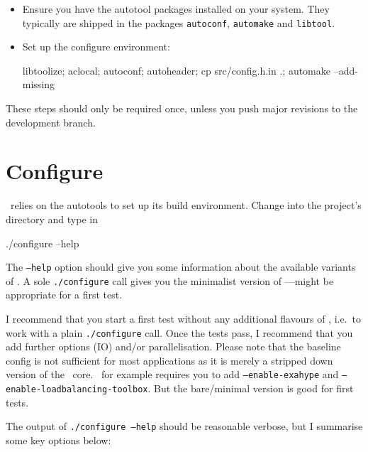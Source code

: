 \begin{itemize}
  \item Ensure you have the autotool packages installed on your system. They
  typically are shipped in the packages \texttt{autoconf}, \texttt{automake} and
  \texttt{libtool}.
  \item Set up the configure environment: 
 \begin{code}
 libtoolize; aclocal; autoconf; autoheader; 
 cp src/config.h.in .; 
 automake --add-missing
 \end{code}
\end{itemize}


\noindent
These steps should only be required once, unless you push major revisions to the
development branch.


\section{Configure}
\label{section:installation:configure}


\Peano\  relies on the autotools to set up its build environment.
Change into the project's directory and type in 
\begin{code}
./configure --help
\end{code}


\noindent
The \texttt{--help} option should give you some information about the available
variants of \Peano.
A sole \texttt{./configure} call gives you the minimalist version of
\Peano---might be appropriate for a first test.

\begin{remark}
 I recommend that you start a first test without any additional flavours of
 \Peano, i.e.~to work with a plain \texttt{./configure} call. Once the tests
 pass, I recommend that you add further options (IO) and/or parallelisation.
 Please note that the baseline config is not sufficient for most applications
 as it is merely a stripped down version of the \Peano\ core.
 \ExaHyPE\ for example requires you to add \texttt{--enable-exahype} and
 \texttt{--enable-loadbalancing-toolbox}. 
 But the bare/minimal version is good for first tests.
\end{remark}


\noindent
The output of \texttt{./configure --help} should be reasonable verbose, but I
summarise some key options below:

